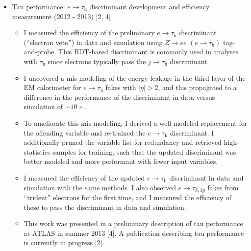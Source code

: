 \documentclass{resume2}
\begin{document}
\begin{resume}
\begin{itemize}
\item Tau performance: $e\!\rightarrow\!\tau_\text{h}$ discriminant development and efficiency measurement (2012 - 2013) [2, 4]
  \begin{itemize}
  \item I measured the efficiency of the preliminary $e\!\rightarrow\!\tau_\text{h}$ discriminant (``electron veto'') in data and simulation using $Z \!\rightarrow\! ee$ $(e\!\rightarrow\!\tau_\text{h})$ tag-and-probe. This BDT-based discriminant is commonly used in analyses with $\tau_\text{h}$ since electrons typically pass the $j\rightarrow\tau_\text{h}$ discriminant. 
  \item I uncovered a mis-modeling of the energy leakage in the third layer of the EM calorimeter for $e\!\rightarrow\!\tau_\text{h}$ fakes with $|\eta| > 2$, and this propagated to a difference in the performance of the discriminant in data versus simulation of $\sim\!10\times$.
  \item To ameliorate this mis-modeling, I derived a well-modeled replacement for the offending variable and re-trained the $e\!\rightarrow\!\tau_\text{h}$ discriminant. I additionally pruned the variable list for redundancy and retrieved high-statistics samples for training, such that the updated discriminant was better modeled and more performant with fewer input variables.
  \item I measured the efficiency of the updated $e\!\rightarrow\!\tau_\text{h}$ discriminant in data and simulation with the same methods. I also observed $e\!\rightarrow\!\tau_{h,3p}$ fakes from ``trident'' electrons for the first time, and I measured the efficiency of these to pass the discriminant in data and simulation.
  \item This work was presented in a preliminary description of tau performance at ATLAS in summer 2013 [4]. A publication describing tau performance is currently in progress [2].
  \end{itemize}


\end{itemize}
\end{resume}
\end{document}
